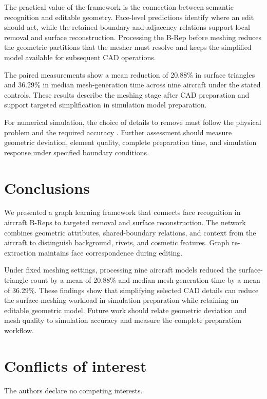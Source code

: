 \documentclass[12pt,a4paper]{article}
\begin{document}
The practical value of the framework is the connection between semantic recognition and editable geometry. Face-level predictions identify where an edit should act, while the retained boundary and adjacency relations support local removal and surface reconstruction. Processing the B-Rep before meshing reduces the geometric partitions that the mesher must resolve and keeps the simplified model available for subsequent CAD operations.

The paired measurements show a mean reduction of 20.88\% in surface triangles and 36.29\% in median mesh-generation time across nine aircraft under the stated controls. These results describe the meshing stage after CAD preparation and support targeted simplification in simulation model preparation.

For numerical simulation, the choice of details to remove must follow the physical problem and the required accuracy \parencite{antolin2024analysis_aware_defeaturing}. Further assessment should measure geometric deviation, element quality, complete preparation time, and simulation response under specified boundary conditions.

\section{Conclusions}

We presented a graph learning framework that connects face recognition in aircraft B-Reps to targeted removal and surface reconstruction. The network combines geometric attributes, shared-boundary relations, and context from the aircraft to distinguish background, rivets, and cosmetic features. Graph re-extraction maintains face correspondence during editing.

\begin{samepage}
Under fixed meshing settings, processing nine aircraft models reduced the surface-triangle count by a mean of 20.88\% and median mesh-generation time by a mean of 36.29\%. These findings show that simplifying selected CAD details can reduce the surface-meshing workload in simulation preparation while retaining an editable geometric model. Future work should relate geometric deviation and mesh quality to simulation accuracy and measure the complete preparation workflow.
\end{samepage}

\section*{Conflicts of interest}
The authors declare no competing interests.
\end{document}
